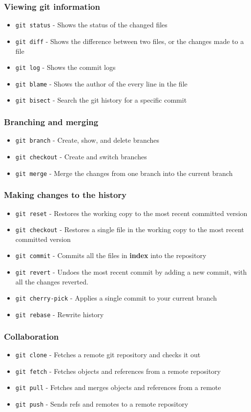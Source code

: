 \documentclass{beamer}
\begin{document}
\begin{frame}
  \frametitle{Viewing git information}
  \begin{itemize}
    \item {\tt git status} - Shows the status of the changed files
    \item {\tt git diff} - Shows the difference between two files, or the changes made to a file
    \item {\tt git log} - Shows the commit logs
    \item {\tt git blame} - Shows the author of the every line in the file
    \item {\tt git bisect} - Search the git history for a specific commit
  \end{itemize}
\end{frame}

\begin{frame}
  \frametitle{Branching and merging}
  \begin{itemize}
    \item {\tt git branch} - Create, show, and delete branches
    \item {\tt git checkout} - Create and switch branches
    \item {\tt git merge} - Merge the changes from one branch into the current branch
  \end{itemize}
\end{frame}

\begin{frame}
  \frametitle{Making changes to the history}
  \begin{itemize}
    \item {\tt git reset} - Restores the working copy to the most recent committed version
    \item {\tt git checkout} - Restores a single file in the working copy to the most recent committed version
    \item {\tt git commit} - Commits all the files in {\bf index} into the repository 
    \item {\tt git revert} - Undoes the most recent commit by adding a new commit, with all the changes reverted.
    \item {\tt git cherry-pick} - Applies a single commit to your current branch
    \item {\tt git rebase} - Rewrite history
  \end{itemize}
\end{frame}

\begin{frame}
  \frametitle{Collaboration}
  \begin{itemize}
    \item {\tt git clone} - Fetches a remote git repository and checks it out
    \item {\tt git fetch} - Fetches objects and references from a remote repository
    \item {\tt git pull} - Fetches and merges objects and references from a remote
    \item {\tt git push} - Sends refs and remotes to a remote repository
  \end{itemize}
\end{frame}
\end{document}
